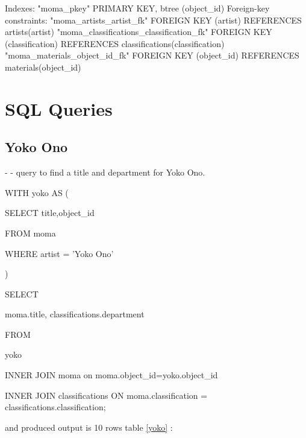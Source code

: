\documentclass[journal,transmag]{IEEEtran}
\begin{document}
Indexes:
    "moma\_pkey" PRIMARY KEY, btree (object\_id)
Foreign-key constraints:
    "moma\_artists\_artist\_fk" FOREIGN KEY (artist) REFERENCES artists(artist)
    "moma\_classifications\_classification\_fk" FOREIGN KEY (classification) REFERENCES classifications(classification)
    "moma\_materials\_object\_id\_fk" FOREIGN KEY (object\_id) REFERENCES materials(object\_id)

\section {SQL Queries}

\subsection{Yoko Ono}
- - query to find a title and department for Yoko Ono.

WITH yoko AS (

SELECT title,object\_id

  FROM moma

  WHERE artist = 'Yoko Ono'

)

SELECT

    moma.title, classifications.department

FROM

    yoko

    INNER JOIN moma on moma.object\_id=yoko.object\_id

    INNER JOIN classifications ON moma.classification = classifications.classification;
\newline

and produced output is 10 rows table \ref{yoko} : 
\end{document}
